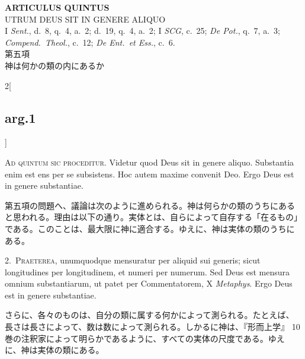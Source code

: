 \documentclass[paper=a4paper,fontsize=10pt,jafontsize=9pt,titlepage]{jlreq}
\begin{document}
\newpage
{}
{}
\setcounter{section}{5}
\setcounter{subsection}{0}
\begin{center}
 {\Large {\bfseries ARTICULUS QUINTUS}}\\
 {\large UTRUM DEUS SIT IN GENERE ALIQUO}\\
 {\footnotesize I {\itshape Sent.}, d.~8, q.~4, a.~2; d.~19, q.~4, a.~2;
 I {\itshape SCG}, c.~25; {\itshape De Pot.}, q.~7, a.~3; {\itshape
 Compend.~Theol.}, c.~12; {\itshape De Ent.~et Ess.}, c.~6.}\\
 {\Large 第五項\\神は何かの類の内にあるか}
\end{center}

\begin{paracol}{2}[\subsection{arg.1}]

{\huge A}{\scshape d quintum sic proceditur}. Videtur quod Deus sit in
 genere aliquo. Substantia enim est ens per se subsistens. Hoc autem
 maxime convenit Deo. Ergo Deus est in genere substantiae.

\switchcolumn

第五項の問題へ、議論は次のように進められる。神は何らかの類のうちにある
と思われる。理由は以下の通り。実体とは、自らによって自存する「在るもの」
である。このことは、最大限に神に適合する。ゆえに、神は実体の類のうちに
ある。


2.~{\scshape Praeterea}, unumquodque mensuratur per aliquid sui
generis; sicut longitudines per longitudinem, et numeri per
numerum. Sed Deus est mensura omnium substantiarum, ut patet per
Commentatorem, X {\itshape Metaphys}. Ergo Deus est in genere
substantiae.

\switchcolumn

さらに、各々のものは、自分の類に属する何かによって測られる。たとえば、
長さは長さによって、数は数によって測られる。しかるに神は、『形而上学』
10巻の注釈家によって明らかであるように、すべての実体の尺度である。ゆえ
に、神は実体の類にある。

\switchcolumn*[\subsection{s.c.}]


\end{paracol}
\end{document}
